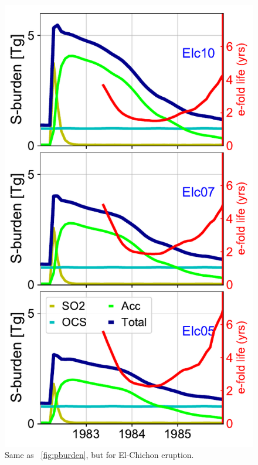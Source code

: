 \documentclass[acpd, hvmath, online]{copernicus_discussions}
\begin{document}
\newpage
\begin{figure}[ht!]
\includegraphics[width=.6\textwidth,height=.8\textheight,trim={0.1cm 0.1cm 0.1cm 0.1cm},clip]{Elc_burden.pdf}
\caption{Same as ~\ref{fig:pburden}, but for El-Chichon eruption.} 
\label{fig:eburden}
\end{figure}
\end{document}
